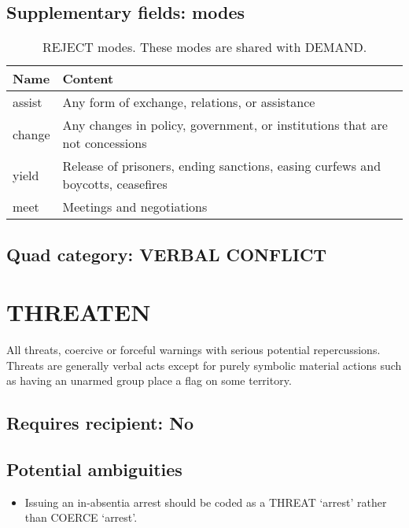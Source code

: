 \documentclass[11pt]{report}
\newcommand{\plcat}[1]{\textsf{#1}}
\begin{document}
\subsection{Supplementary fields: modes}

\begin{table}[htp]
\caption{\plcat{REJECT} modes. These modes are shared with \plcat{DEMAND}.}
\begin{center}
\begin{tabular}{|l|p{13cm}|}
\hline
Name & Content \\
\hline
assist & Any form of exchange, relations, or assistance\\
change & Any changes in policy, government, or institutions that are not concessions \\
yield & Release of prisoners, ending sanctions, easing curfews and boycotts, ceasefires\\
meet & Meetings and negotiations\\
\hline
\end{tabular}
\end{center}
\label{tab:rejectmode}
\end{table}%


\subsection{Quad category: VERBAL CONFLICT}

\newpage


\section{THREATEN}

All threats, coercive or forceful warnings with serious potential repercussions. Threats are generally verbal acts except for purely symbolic material actions such as having an unarmed group place a flag on some territory.
\subsection{Requires recipient: No}

\subsection{Potential ambiguities}

\begin{itemize}
\item Issuing an in-absentia arrest should be coded as a \plcat{THREAT} `arrest' rather than \plcat{COERCE} `arrest'.
\end{itemize}
\end{document}
